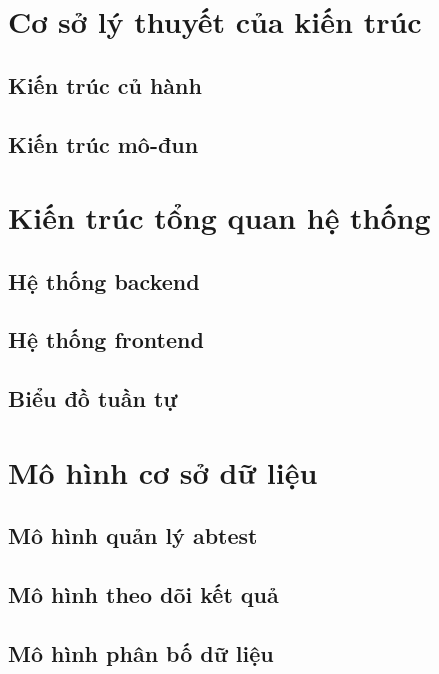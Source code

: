 \section{Cơ sở lý thuyết của kiến trúc}

\subsection{Kiến trúc củ hành}

\subsection{Kiến trúc mô-đun}

\section{Kiến trúc tổng quan hệ thống}

\subsection{Hệ thống backend}

\subsection{Hệ thống frontend}

\subsection{Biểu đồ tuần tự}

\section{Mô hình cơ sở dữ liệu}

\subsection{Mô hình quản lý abtest}

\subsection{Mô hình theo dõi kết quả}

\subsection{Mô hình phân bố dữ liệu}
